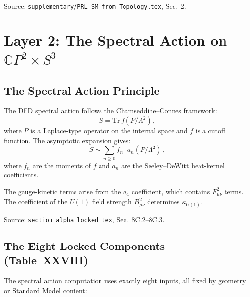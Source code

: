 \documentclass[12pt,a4paper]{article}
\begin{document}
Source: \texttt{supplementary/PRL\_SM\_from\_Topology.tex}, Sec.~2.

\section{Layer 2: The Spectral Action on $\mathbb{C}P^2 \times S^3$}
\label{sec:layer2}

\subsection{The Spectral Action Principle}

The DFD spectral action follows the Chamseddine--Connes framework:
\begin{equation}
S = \mathrm{Tr}\,f(P/\Lambda^2)\,,
\end{equation}
where $P$ is a Laplace-type operator on the internal space and $f$
is a cutoff function. The asymptotic expansion gives:
\begin{equation}
S \sim \sum_{n \ge 0} f_n \cdot a_n(P/\Lambda^2)\,,
\end{equation}
where $f_n$ are the moments of $f$ and $a_n$ are the Seeley--DeWitt
heat-kernel coefficients.

The gauge-kinetic terms arise from the $a_4$ coefficient, which
contains $F_{\mu\nu}^2$ terms. The coefficient of the $U(1)$ field
strength $B_{\mu\nu}^2$ determines $\kappa_{U(1)}$.

Source: \texttt{section\_alpha\_locked.tex}, Sec.~8C.2--8C.3.

\subsection{The Eight Locked Components (Table~XXVIII)}

The spectral action computation uses exactly eight inputs, all fixed
by geometry or Standard Model content:
\end{document}
